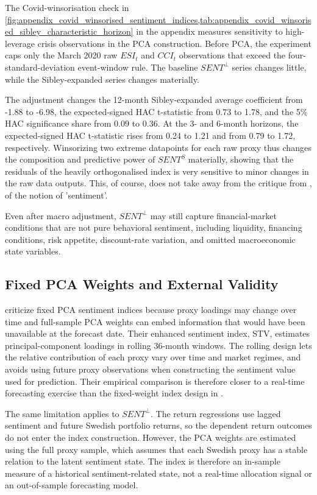 \documentclass[11pt]{article}
\newcommand{\var}[1]{\ensuremath{#1}}
\begin{document}
The Covid-winsorisation check in \cref{fig:appendix_covid_winsorised_sentiment_indices,tab:appendix_covid_winsorised_sibley_characteristic_horizon} in the appendix measures sensitivity to high-leverage crisis observations in the PCA construction. Before PCA, the experiment caps only the March 2020 raw \var{ESI_t} and \var{CCI_t} observations that exceed the four-standard-deviation event-window rule. The baseline \var{SENT^{\perp}} series changes little, while the Sibley-expanded series changes materially.

The adjustment changes the 12-month Sibley-expanded average coefficient from -1.88 to -6.98, the expected-signed HAC t-statistic from 0.73 to 1.78, and the 5\% HAC significance share from 0.09 to 0.36. At the 3- and 6-month horizons, the expected-signed HAC t-statistic rises from 0.24 to 1.21 and from 0.79 to 1.72, respectively. Winsorizing two extreme datapoints for each raw proxy thus changes the composition and predictive power of \var{SENT^{S}} materially, showing that the residuals of the heavily orthogonalised index is very sensitive to minor changes in the raw data outputs. This, of course, does not take away from the critique from \citet{sibley2012sentimental}, of the notion of 'sentiment'.

Even after macro adjustment, \var{SENT^{\perp}} may still capture financial-market conditions that are not pure behavioral sentiment, including liquidity, financing conditions, risk appetite, discount-rate variation, and omitted macroeconomic state variables.

\subsection{Fixed PCA Weights and External Validity}
\citet{ung2024enhanced} criticize fixed PCA sentiment indices because proxy loadings may change over time and full-sample PCA weights can embed information that would have been unavailable at the forecast date. Their enhanced sentiment index, STV, estimates principal-component loadings in rolling 36-month windows. The rolling design lets the relative contribution of each proxy vary over time and market regimes, and avoids using future proxy observations when constructing the sentiment value used for prediction. Their empirical comparison is therefore closer to a real-time forecasting exercise than the fixed-weight index design in \citet{baker2006sentiment}.

The same limitation applies to \var{SENT^{\perp}}. The return regressions use lagged sentiment and future Swedish portfolio returns, so the dependent return outcomes do not enter the index construction. However, the PCA weights are estimated using the full proxy sample, which assumes that each Swedish proxy has a stable relation to the latent sentiment state. The index is therefore an in-sample measure of a historical sentiment-related state, not a real-time allocation signal or an out-of-sample forecasting model. 
\end{document}
